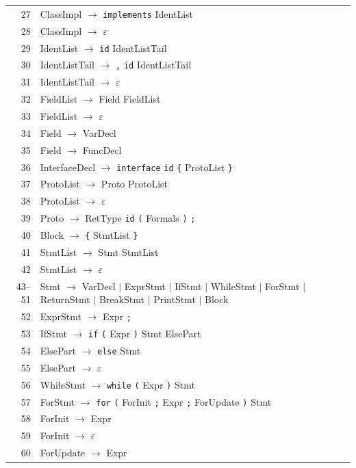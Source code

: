 \documentclass[12pt,a4paper]{article}
\begin{document}
\begin{longtable}{rp{11cm}}
27 & ClassImpl $\rightarrow$ \texttt{implements} IdentList \\
28 & ClassImpl $\rightarrow$ $\varepsilon$ \\
29 & IdentList $\rightarrow$ \texttt{id} IdentListTail \\
30 & IdentListTail $\rightarrow$ \texttt{,} \texttt{id} IdentListTail \\
31 & IdentListTail $\rightarrow$ $\varepsilon$ \\
32 & FieldList $\rightarrow$ Field FieldList \\
33 & FieldList $\rightarrow$ $\varepsilon$ \\
34 & Field $\rightarrow$ VarDecl \\
35 & Field $\rightarrow$ FuncDecl \\
36 & InterfaceDecl $\rightarrow$ \texttt{interface} \texttt{id} \texttt{\{} ProtoList \texttt{\}} \\
37 & ProtoList $\rightarrow$ Proto ProtoList \\
38 & ProtoList $\rightarrow$ $\varepsilon$ \\
39 & Proto $\rightarrow$ RetType \texttt{id} \texttt{(} Formals \texttt{)} \texttt{;} \\
40 & Block $\rightarrow$ \texttt{\{} StmtList \texttt{\}} \\
41 & StmtList $\rightarrow$ Stmt StmtList \\
42 & StmtList $\rightarrow$ $\varepsilon$ \\
43--51 & Stmt $\rightarrow$ VarDecl $\mid$ ExprStmt $\mid$ IfStmt $\mid$ WhileStmt $\mid$ ForStmt $\mid$ ReturnStmt $\mid$ BreakStmt $\mid$ PrintStmt $\mid$ Block \\
52 & ExprStmt $\rightarrow$ Expr \texttt{;} \\
53 & IfStmt $\rightarrow$ \texttt{if} \texttt{(} Expr \texttt{)} Stmt ElsePart \\
54 & ElsePart $\rightarrow$ \texttt{else} Stmt \\
55 & ElsePart $\rightarrow$ $\varepsilon$ \\
56 & WhileStmt $\rightarrow$ \texttt{while} \texttt{(} Expr \texttt{)} Stmt \\
57 & ForStmt $\rightarrow$ \texttt{for} \texttt{(} ForInit \texttt{;} Expr \texttt{;} ForUpdate \texttt{)} Stmt \\
58 & ForInit $\rightarrow$ Expr \\
59 & ForInit $\rightarrow$ $\varepsilon$ \\
60 & ForUpdate $\rightarrow$ Expr \\

\end{longtable}
\end{document}
